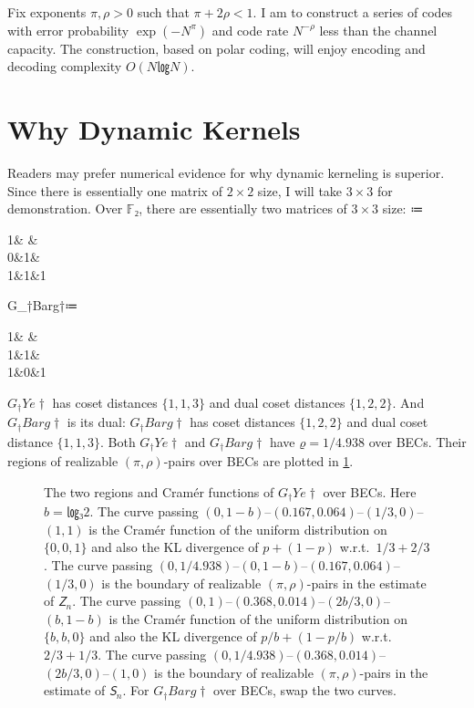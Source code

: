 \documentclass[openany]{amsbook}
\numberwithin{equation}{chapter}
\numberwithin{figure}{chapter}
\numberwithin{table}{chapter}
\def\GY{G_†Ye†}
\def\GB{G_†Barg†}
\def\bma#1{\begin{bmatrix}#1\end{bmatrix}}
\def\[#1\]{\begin{equation*}{#1}\end{equation*}}
\theoremstyle{definition}	理dfn:Definition~?s			理exa:Example~?s
\theoremstyle{remark}		理cla:Claim~?s				理rem:Remark~?s
\begin{document}
	Fix exponents $π,ρ>0$ such that $π+2ρ<1$.
	I am to construct a series of codes with error probability $\exp(-N^π)$
	and code rate $N^{-ρ}$ less than the channel capacity.
	The construction, based on polar coding,
	will enjoy encoding and decoding complexity $O(N㏒N)$.

\section{Why Dynamic Kernels}

	Readers may prefer numerical evidence for why dynamic kerneling is superior.
	Since there is essentially one matrix of $2×2$ size,
	I will take $3×3$ for demonstration.
	Over $𝔽₂$, there are essentially two matrices of $3×3$ size:
	\[\GY≔\bma{1& & \\0&1& \\1&1&1}\qquad\GB≔\bma{1& & \\1&1& \\1&0&1}\]
	$\GY$ has coset distances $\{1,1,3\}$ and dual coset distances $\{1,2,2\}$.
	And $\GB$ is its dual:
	$\GB$ has coset distances $\{1,2,2\}$ and dual coset distance $\{1,1,3\}$.
	Both $\GY$ and $\GB$ have $ϱ=1/4.938$ over BECs.
	Their regions of realizable $(π,ρ)$-pairs over BECs are plotted in \cref{fig:rigid}.
	
	\begin{figure}
		\caption{
			The two regions and Cramér functions of $\GY$ over BECs.
			Here $b=㏒₃2$.
			The curve passing $(0,1-b)$--$(0.167,0.064)$--$(1/3,0)$--$(1,1)$
			is the Cramér function of the uniform distribution on $\{0,0,1\}$
			and also the KL divergence of $p+(1-p)$ w.r.t.\ $1/3+2/3$.
			The curve passing $(0,1/4.938)$--$(0,1-b)$--$(0.167,0.064)$--$(1/3,0)$
			is the boundary of realizable $(π,ρ)$-pairs in the estimate of $𝘡_n$.
			The curve passing $(0,1)$--$(0.368,0.014)$--$(2b/3,0)$--$(b,1-b)$
			is the Cramér function of the uniform distribution on $\{b,b,0\}$
			and also the KL divergence of $p/b+(1-p/b)$ w.r.t.\ $2/3+1/3$.
			The curve passing $(0,1/4.938)$--$(0.368,0.014)$--$(2b/3,0)$--$(1,0)$
			is the boundary of realizable $(π,ρ)$-pairs in the estimate of $𝘚_n$.
			For $\GB$ over BECs, swap the two curves.
		}\label{fig:rigid}
	\end{figure}
	
\end{document}

